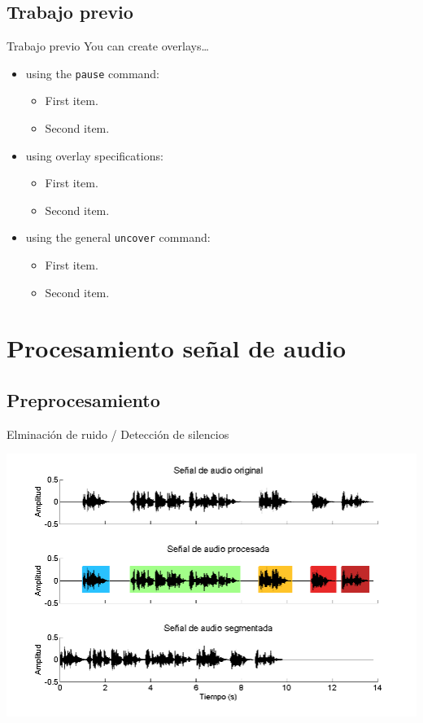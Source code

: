 \documentclass[10pt]{beamer}
\begin{document}
\subsection{Trabajo previo}
\begin{frame}{Trabajo previo}
  You can create overlays\dots
  \begin{itemize}
  \item using the \texttt{pause} command:
    \begin{itemize}
    \item
      First item.
    \item    
      Second item.
    \end{itemize}
  \item
    using overlay specifications:
    \begin{itemize}
    \item
      First item.
    \item
      Second item.
    \end{itemize}
  \item
    using the general \texttt{uncover} command:
    \begin{itemize}
   		\item
        First item.
    	\item
        Second item.
    \end{itemize}
  \end{itemize}
\end{frame}

\section{Procesamiento señal de audio}

\subsection{Preprocesamiento}

\begin{frame}{Elminación de ruido / Detección de silencios}
	\begin{center}
	  \includegraphics[width=1\textwidth]{gfx/f-silence}
  \end{center}
\end{frame}
\end{document}
